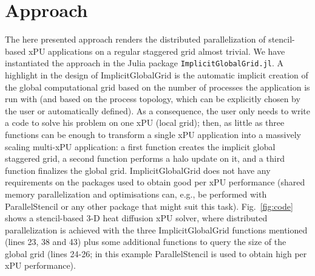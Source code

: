 \documentclass{juliacon}
\begin{document}
\section{Approach}
The here presented approach renders the distributed parallelization of stencil-based xPU applications on a regular staggered grid almost trivial. We have instantiated the approach in the Julia package \texttt{ImplicitGlobalGrid.jl}. A highlight in the design of ImplicitGlobalGrid is the automatic implicit creation of the global computational grid based on the number of processes the application is run with (and based on the process topology, which can be explicitly chosen by the user or automatically defined). As a consequence, the user only needs to write a code to solve his problem on one xPU (local grid); then, as little as three functions can be enough to transform a single xPU application into a massively scaling multi-xPU application: a first function creates the implicit global staggered grid, a second function performs a halo update on it, and a third function finalizes the global grid. ImplicitGlobalGrid does not have any requirements on the packages used to obtain good per xPU performance (shared memory parallelization and optimisations can, e.g., be performed with ParallelStencil \cite{parallelstencil2024} or any other package that might suit this task). Fig.~\ref{fig:code} shows a stencil-based 3-D heat diffusion xPU solver, where distributed parallelization is achieved with the three ImplicitGlobalGrid functions mentioned (lines 23, 38 and 43) plus some additional functions to query the size of the global grid (lines 24-26; in this example ParallelStencil \cite{parallelstencil2024} is used to obtain high per xPU performance).
\end{document}
